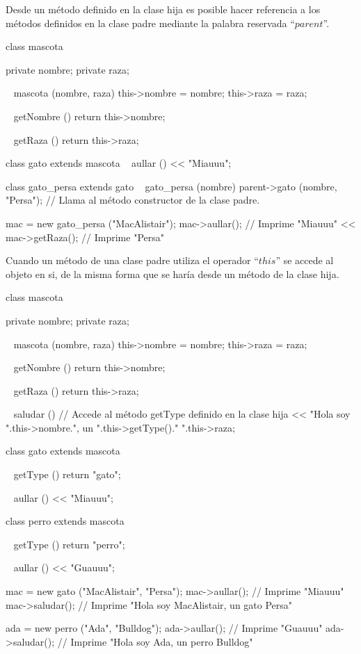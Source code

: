 Desde un método definido en la clase hija es posible hacer referencia a los métodos definidos en la clase padre 
mediante la palabra reservada ``$parent$''. \\

\begin{myverbatim}
   class mascota {
      private nombre; 
      private raza;
      
      ~ mascota (nombre, raza) { 
        this->nombre = nombre; 
        this->raza = raza;
      }
      
      ~ getNombre () {
         return this->nombre;
      }
      
      ~ getRaza () {
         return this->raza;
      }
      
   }

   class gato extends mascota {
       ~ aullar () { 
         << "Miauuu";
      }
   }

   class gato_persa extends gato {
       ~ gato_persa (nombre) {
         parent->gato (nombre, "Persa"); // Llama al método constructor de la clase padre.
       }
   }
   
   mac = new gato_persa ("MacAlistair"); 
   mac->aullar(); // Imprime "Miauuu"
   << mac->getRaza(); // Imprime "Persa"
\end{myverbatim}

Cuando un método de una clase padre utiliza el operador ``$this$'' se accede al objeto
en si, de la misma forma que se haría desde un método de la clase hija.  \\

\begin{myverbatim}
   class mascota {
      private nombre; 
      private raza;
      
      ~ mascota (nombre, raza) { 
        this->nombre = nombre; 
        this->raza = raza;
      }
      
      ~ getNombre () {
         return this->nombre;
      }
      
      ~ getRaza () {
         return this->raza;
      }
      
      ~ saludar () {
         // Accede al método getType definido en la clase hija
         << "Hola soy ".this->nombre.", un ".this->getType()." ".this->raza;  
      }
      
   }

   class gato extends mascota {
       ~ getType () {
         return "gato";
       }
       
       ~ aullar () { 
         << "Miauuu";
      }
   }

   class perro extends mascota {
       ~ getType () {
         return "perro";
       }
       
       ~ aullar () { 
         << "Guauuu";
      }
   }
   
   mac = new gato ("MacAlistair", "Persa"); 
   mac->aullar(); // Imprime "Miauuu"
   mac->saludar(); // Imprime "Hola soy MacAlistair, un gato Persa"
   
   ada = new perro ("Ada", "Bulldog"); 
   ada->aullar(); // Imprime "Guauuu"
   ada->saludar(); // Imprime "Hola soy Ada, un perro Bulldog"
\end{myverbatim}

